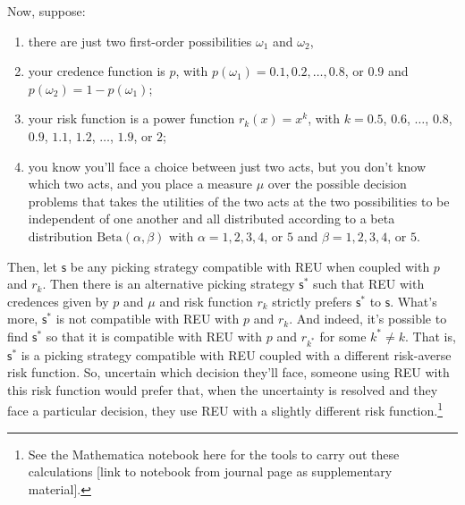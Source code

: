 \documentclass[a4paper,final]{article}
\newcommand\s{\mathsf{s}}
\newcommand{\todoold}[2][]{\todo[backgroundcolor=white,bordercolor=orange!10,linecolor=gray!10, #1,caption={},textcolor=gray]{Pre-rev: #2}}
\newcommand{\todooldinfo}[2][]{\todoold[#1]{#2}}
\newenvironment{CCM rewritten}
{\begingroup\color{blue}} %
{\endgroup}              %
\begin{document}


Now, suppose:
\begin{enumerate}[label={\normalfont (i)}]
\item there are just two first-order possibilities $\omega_1$ and $\omega_2$,
\item your credence function is $p$, with $p(\omega_1) = 0.1, 0.2, \ldots, 0.8$, or $0.9$ and $p(\omega_2) = 1-p(\omega_1)$;
\item your risk function is a power function $r_k(x) = x^k$, with $k = 0.5$, $0.6$, $\ldots$, $0.8$, $0.9$, $1.1$, $1.2$, $\ldots$, $1.9$, or $2$;
\item you know you'll face a choice between just two acts, but you don't know which two acts, and you place a measure $\mu$ over the possible decision problems that takes the utilities of the two acts at the two possibilities to be independent of one another and all distributed according to a beta distribution $\mathrm{Beta}(\alpha, \beta)$ with $\alpha = 1, 2, 3, 4$, or $5$ and $\beta = 1, 2, 3, 4$, or $5$.\end{enumerate}
Then, let $\s$ be any picking strategy compatible with REU when coupled with $p$ and $r_k$. Then there is an alternative picking strategy $\s^*$ such that REU with credences given by $p$ and $\mu$ and risk function $r_k$ strictly prefers $\s^*$ to $\s$. What's more, $\s^*$ is not compatible with REU with $p$ and $r_k$. And indeed, it's possible to find $\s^*$ so that it is compatible with REU with $p$ and $r_{k^*}$ for some $k^* \neq k$. That is, $\s^*$ is a picking strategy compatible with REU coupled with a different risk-averse risk function. So, uncertain which decision they'll face, someone using REU with this risk function would prefer that, when the uncertainty is resolved and they face a particular decision, they use REU with a slightly different risk function.\footnote{See the Mathematica notebook here for the tools to carry out these calculations [link to notebook from journal page as supplementary material].}%

\end{document}
